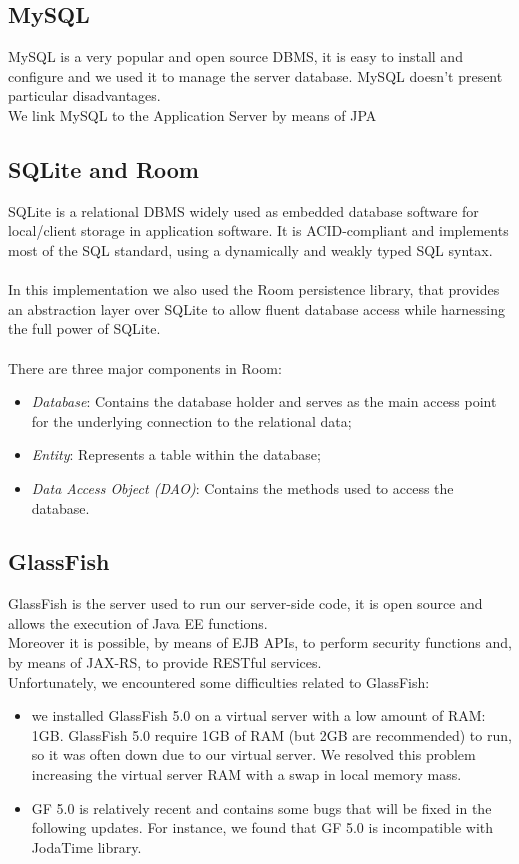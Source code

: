 \subsection{MySQL}
\label{subsec:Middleware}
MySQL is a very popular and open source DBMS, it is easy to install and configure and we used it to manage the server database. MySQL doesn't present particular disadvantages.\\
We link MySQL to the Application Server by means of JPA
\subsection{SQLite and Room}
\label{subsec:SQLite and Room}
SQLite is a relational DBMS widely used as embedded database software for local/client storage in application software. It is ACID-compliant and implements most of the SQL standard, using a dynamically and weakly typed SQL syntax. \\\\
In this implementation we also used the Room persistence library, that provides an abstraction layer over SQLite to allow fluent database access while harnessing the full power of SQLite. \\\\
There are three major components in Room:
\begin{itemize}
\item \textit{Database}: Contains the database holder and serves as the main access point for the underlying connection to the relational data;
\item \textit{Entity}: Represents a table within the database;
\item \textit{Data Access Object (DAO)}: Contains the methods used to access the database.
\end{itemize}
\subsection{GlassFish}
\label{subsec:GlassFish}
GlassFish is the server used to run our server-side code, it is open source and allows the execution of Java EE functions.\\
Moreover it is possible, by means of EJB APIs, to perform security functions and, by means of JAX-RS, to provide RESTful services. \\
Unfortunately, we encountered some difficulties related to GlassFish:
\begin{itemize}
\item we installed GlassFish 5.0 on a virtual server with a low amount of RAM: 1GB. GlassFish 5.0 require 1GB of RAM (but 2GB are recommended) to run, so it was often down due to our virtual server. We resolved this problem increasing the virtual server RAM with a swap in local memory mass.
\item GF 5.0 is relatively recent and contains some bugs that will be fixed in the following updates. For instance, we found that GF 5.0 is incompatible with JodaTime library. 
\end{itemize}